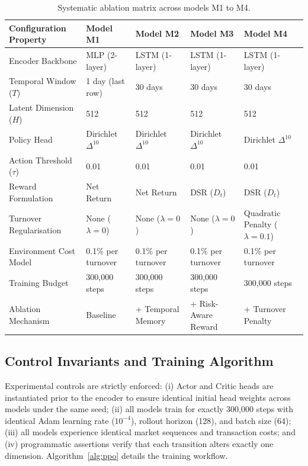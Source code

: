 \documentclass[11pt,a4paper]{article}
\numberwithin{equation}{section}
\numberwithin{table}{section}
\numberwithin{figure}{section}
\numberwithin{algorithm}{section}
\begin{document}
\begin{table}[!htbp]
\centering\small
\caption{Systematic ablation matrix across models M1 to M4.}\label{tab:ablation}
\footnotesize\setlength{\tabcolsep}{3pt}
\begin{tabular}{@{}p{3.0cm}CCCC@{}}
\toprule
Configuration Property & Model M1 & Model M2 & Model M3 & Model M4\\
\midrule
Encoder Backbone & MLP (2-layer) & LSTM (1-layer) & LSTM (1-layer) & LSTM (1-layer)\\
Temporal Window ($T$) & 1 day (last row) & 30 days & 30 days & 30 days\\
Latent Dimension ($H$) & 512 & 512 & 512 & 512\\
Policy Head & Dirichlet $\Delta^{10}$ & Dirichlet $\Delta^{10}$ & Dirichlet $\Delta^{10}$ & Dirichlet $\Delta^{10}$\\
Action Threshold ($\tau$) & 0.01 & 0.01 & 0.01 & 0.01\\
Reward Formulation & Net Return & Net Return & DSR ($D_t$) & DSR ($D_t$)\\
Turnover Regularisation & None ($\lambda=0$) & None ($\lambda=0$) & None ($\lambda=0$) & Quadratic Penalty ($\lambda=0.1$)\\
Environment Cost Model & 0.1\% per turnover & 0.1\% per turnover & 0.1\% per turnover & 0.1\% per turnover\\
Training Budget & 300,000 steps & 300,000 steps & 300,000 steps & 300,000 steps\\
Ablation Mechanism & Baseline & + Temporal Memory & + Risk-Aware Reward & + Turnover Penalty\\
\bottomrule
\end{tabular}
\end{table}

\subsection{Control Invariants and Training Algorithm}
Experimental controls are strictly enforced: (i) Actor and Critic heads are instantiated prior to the encoder to ensure identical initial head weights across models under the same seed; (ii) all models train for exactly 300,000 steps with identical Adam learning rate ($10^{-4}$), rollout horizon (128), and batch size (64); (iii) all models experience identical market sequences and transaction costs; and (iv) programmatic assertions verify that each transition alters exactly one dimension. Algorithm~\ref{alg:ppo} details the training workflow.
\end{document}
